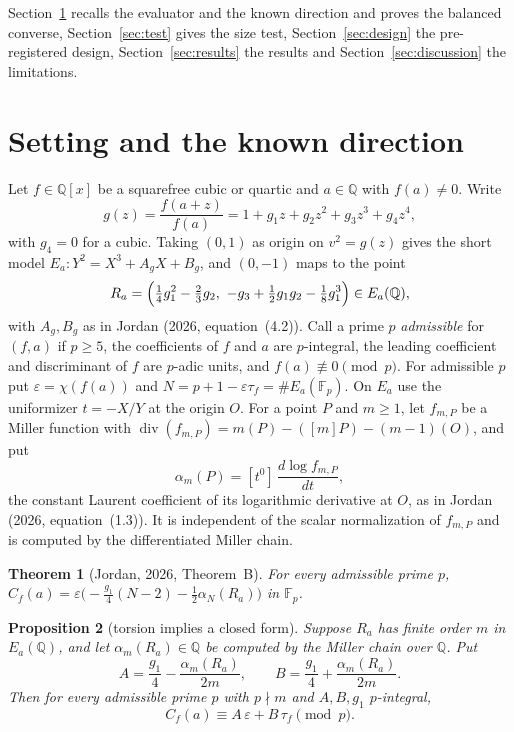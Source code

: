\documentclass[11pt,a4paper]{article}
\numberwithin{equation}{section}
\theoremstyle{plain}
\newtheorem{theorem}{Theorem}[section]
\newtheorem{proposition}[theorem]{Proposition}
\theoremstyle{definition}
\newcommand{\F}{\mathbb{F}}
\newcommand{\Q}{\mathbb{Q}}
\newcommand{\eps}{\varepsilon}
\DeclareMathOperator{\divisor}{div}
\begin{document}
Section~\ref{sec:setting} recalls the evaluator and the known direction and proves the balanced converse, Section~\ref{sec:test} gives the size test, Section~\ref{sec:design} the pre-registered design, Section~\ref{sec:results} the results and Section~\ref{sec:discussion} the limitations.

\section{Setting and the known direction}\label{sec:setting}

Let $f\in\Q[x]$ be a squarefree cubic or quartic and $a\in\Q$ with $f(a)\neq0$. Write
\begin{equation}\label{eq:g}
g(z)=\frac{f(a+z)}{f(a)}=1+g_1z+g_2z^2+g_3z^3+g_4z^4,
\end{equation}
with $g_4=0$ for a cubic. Taking $(0,1)$ as origin on $v^2=g(z)$ gives the short model $E_a:Y^2=X^3+A_gX+B_g$, and $(0,-1)$ maps to the point
\begin{equation}\label{eq:R}
R_a=\Bigl(\tfrac14g_1^2-\tfrac23g_2,\ -g_3+\tfrac12g_1g_2-\tfrac18g_1^3\Bigr)\in E_a(\Q),
\end{equation}
with $A_g,B_g$ as in Jordan (2026, equation~(4.2)). Call a prime $p$ \emph{admissible} for $(f,a)$ if $p\ge5$, the coefficients of $f$ and $a$ are $p$-integral, the leading coefficient and discriminant of $f$ are $p$-adic units, and $f(a)\not\equiv0\pmod p$. For admissible $p$ put $\eps=\chi(f(a))$ and $N=p+1-\eps\tau_f=\#E_a(\F_p)$. On $E_a$ use the uniformizer $t=-X/Y$ at the origin $O$. For a point $P$ and $m\ge1$, let $f_{m,P}$ be a Miller function with $\divisor(f_{m,P})=m(P)-([m]P)-(m-1)(O)$, and put
\begin{equation}\label{eq:alpha}
\alpha_m(P)=[t^0]\,\frac{d\log f_{m,P}}{dt},
\end{equation}
the constant Laurent coefficient of its logarithmic derivative at $O$, as in Jordan (2026, equation~(1.3)). It is independent of the scalar normalization of $f_{m,P}$ and is computed by the differentiated Miller chain.

\begin{theorem}[Jordan, 2026, Theorem~B]\label{thm:B}
For every admissible prime $p$, $C_f(a)=\eps\bigl(-\tfrac{g_1}{4}(N-2)-\tfrac12\alpha_N(R_a)\bigr)$ in $\F_p$.
\end{theorem}

\begin{proposition}[torsion implies a closed form]\label{prop:known}
Suppose $R_a$ has finite order $m$ in $E_a(\Q)$, and let $\alpha_m(R_a)\in\Q$ be computed by the Miller chain over $\Q$. Put
\begin{equation}\label{eq:Adef}
A=\frac{g_1}{4}-\frac{\alpha_m(R_a)}{2m},\qquad B=\frac{g_1}{4}+\frac{\alpha_m(R_a)}{2m}.
\end{equation}
Then for every admissible prime $p$ with $p\nmid m$ and $A,B,g_1$ $p$-integral,
\begin{equation}\label{eq:AB}
C_f(a)\equiv A\,\eps+B\,\tau_f\pmod p .
\end{equation}
\end{proposition}
\end{document}
